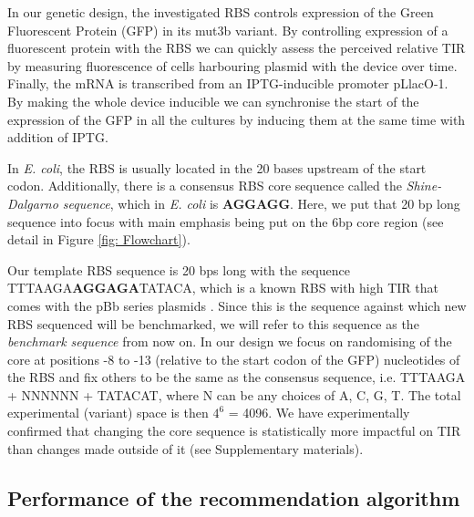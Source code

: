 \documentclass{article}
\begin{document}
In our genetic design, the investigated RBS controls expression of the Green Fluorescent Protein (GFP) in its mut3b variant. 
By controlling expression of a fluorescent protein with the RBS we can quickly assess the perceived relative TIR by measuring fluorescence of cells harbouring plasmid with the device over time.
Finally, the mRNA is transcribed from an IPTG-inducible promoter pLlacO-1. 
By making the whole device inducible we can synchronise the start of the expression of the GFP in all the cultures by inducing them at the same time with addition of IPTG.

In \emph{E. coli}, the RBS is usually located in the 20 bases upstream of the start codon. 
Additionally, there is a consensus RBS core sequence called the \textit{Shine-Dalgarno sequence}, which in \emph{E. coli} is \textbf{AGGAGG}. 
Here, we put that 20 bp long sequence into focus with main emphasis being put on the 6bp core region
(see detail in Figure \ref{fig: Flowchart}).

Our template RBS sequence is 20 bps long with the sequence TTTAAGA\textbf{AGGAGA}TATACA, 
which is a known RBS with high TIR that comes with the pBb series plasmids \cite{Lee2011}. 
Since this is the sequence against which new RBS sequenced will be benchmarked,
we will refer to this sequence as the \textit{benchmark sequence} from now on.
In our design we focus on randomising of the core at positions -8 to -13 (relative to the start codon of the GFP) nucleotides of the RBS and fix others to be the same as the consensus sequence, i.e. TTTAAGA + NNNNNN + TATACAT, where N can be any choices of A, C, G, T. 
The total experimental (variant) space is then $4^6$ = 4096.
We have experimentally confirmed that changing the core sequence is statistically more impactful on TIR than changes made outside of it (see Supplementary materials).

\subsection{Performance of the recommendation algorithm}
 
\end{document}
